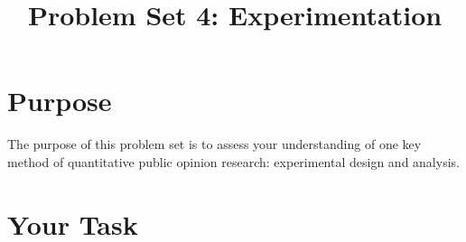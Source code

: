\documentclass[a4paper]{exam}
\title{Problem Set 4: Experimentation}
\date{}
\begin{document}
\vspace{-4em}
\maketitle

\section{Purpose}\label{purpose}

The purpose of this problem set is to assess your understanding of one key method of quantitative public opinion research: experimental design and analysis.

\section{Your Task}\label{your-task}
\end{document}
